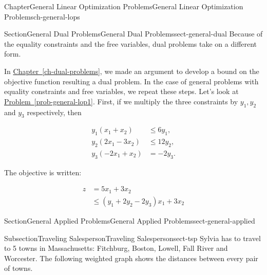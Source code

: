 \documentclass[oneside,10pt,]{book}
\newcommand{\xreffont}{\relax}
\numberwithin{equation}{section}
\newcommand{\amp}{&}
\begin{document}
\begin{chapterptx}{Chapter}{General Linear Optimization Problems}{}{General Linear Optimization Problems}{}{}{ch-general-lops}
%
\begin{sectionptx}{Section}{General Dual Problems}{}{General Dual Problems}{}{}{sect-general-dual}
Because of the equality constraints and the free variables, dual problems take on a different form.%
\par
In \hyperref[ch-dual-problems]{Chapter~{\xreffont\ref{ch-dual-problems}}}, we made an argument to develop a bound on the objective function resulting a dual problem.  In the case of general problems with equality constraints and free variables, we repeat these steps.  Let's look at \hyperref[prob-general-lop1]{Problem~{\xreffont\ref{prob-general-lop1}}}.  First, if we multiply the three constraints by \(y_1, y_2\) and \(y_3\) respectively, then%
\par
%
\begin{equation*}
\begin{aligned}
y_1 (x_1 + x_2) \amp \leq 6 y_1, \\
y_2 (2x_1-3x_2) \amp \leq 12 y_2, \\
y_3 (-2x_1 + x_2) \amp = -2 y_3.
\end{aligned}
\end{equation*}
%
\par
The objective is written:%
\par
%
\begin{equation*}
\begin{aligned}
z \amp = 5x_1 + 3x_2 \\
\amp \leq (y_1 + 2y_2 - 2y_3) x_1 + 3x_2
\end{aligned}
\end{equation*}
%
\end{sectionptx}
%
%
\typeout{************************************************}
\typeout{************************************************}
%
\begin{sectionptx}{Section}{General Applied Problems}{}{General Applied Problems}{}{}{sect-general-applied}
\begin{introduction}{}%
%
\end{introduction}%
%
%
\typeout{************************************************}
\typeout{************************************************}
%
\begin{subsectionptx}{Subsection}{Traveling Salesperson}{}{Traveling Salesperson}{}{}{sect-tsp}
Sylvia has to travel to 5 towns in Massachusetts: Fitchburg, Boston, Lowell, Fall River and Worcester. The following weighted graph shows the distances between every pair of towns.%

\end{subsectionptx}
\end{sectionptx}
\end{chapterptx}
\end{document}

